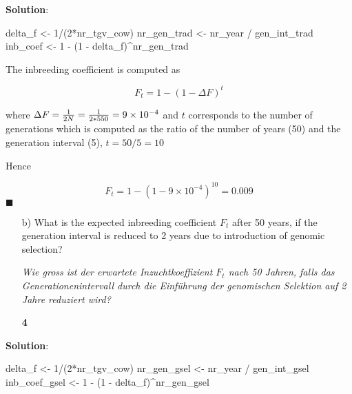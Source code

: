 \documentclass[
]{article}
\newenvironment{Shaded}{\begin{snugshade}}{\end{snugshade}}
\newcommand{\DecValTok}[1]{\textcolor[rgb]{0.00,0.00,0.81}{#1}}
\newcommand{\NormalTok}[1]{#1}
\newcommand{\OtherTok}[1]{\textcolor[rgb]{0.56,0.35,0.01}{#1}}
\newcommand{\SpecialCharTok}[1]{\textcolor[rgb]{0.00,0.00,0.00}{#1}}
\newcommand{\points}[1]
{\begin{flushright}\textbf{#1}\end{flushright}}
\newcommand{\solstart}
{\vspace{3ex}\textbf{Solution}:}
\newcommand{\solend}
{\vspace{2ex}$\blacksquare$}
\begin{document}
\vspace{3ex}
\solstart

\begin{Shaded}
\begin{Highlighting}[]
\NormalTok{delta\_f }\OtherTok{\textless{}{-}} \DecValTok{1}\SpecialCharTok{/}\NormalTok{(}\DecValTok{2}\SpecialCharTok{*}\NormalTok{nr\_tgv\_cow)}
\NormalTok{nr\_gen\_trad }\OtherTok{\textless{}{-}}\NormalTok{ nr\_year }\SpecialCharTok{/}\NormalTok{ gen\_int\_trad}
\NormalTok{inb\_coef }\OtherTok{\textless{}{-}} \DecValTok{1} \SpecialCharTok{{-}}\NormalTok{ (}\DecValTok{1} \SpecialCharTok{{-}}\NormalTok{ delta\_f)}\SpecialCharTok{\^{}}\NormalTok{nr\_gen\_trad}
\end{Highlighting}
\end{Shaded}

The inbreeding coefficient is computed as

\[F_t = 1 - (1 - \Delta F)^t\]

where
\(\Delta F = {1 \over 2N} = {1 \over 2*550} = \ensuremath{9\times 10^{-4}}\)
and \(t\) corresponds to the number of generations which is computed as
the ratio of the number of years (50) and the generation interval (5),
\(t= 50 / 5 = 10\)

Hence

\[F_t =  1 - (1 - \ensuremath{9\times 10^{-4}})^{10} = 0.009\] \solend

\clearpage
\pagebreak

\begin{enumerate}
\item[b)] What is the expected inbreeding coefficient $F_t$ after 50 years, if the generation interval is reduced to 2 years due to introduction of genomic selection?

\textit{Wie gross ist der erwartete Inzuchtkoeffizient $F_t$ nach 50 Jahren, falls das Generationenintervall durch die Einführung der genomischen Selektion auf 2 Jahre reduziert wird?}
\points{4}
\end{enumerate}

\vspace{3ex}
\solstart

\begin{Shaded}
\begin{Highlighting}[]
\NormalTok{delta\_f }\OtherTok{\textless{}{-}} \DecValTok{1}\SpecialCharTok{/}\NormalTok{(}\DecValTok{2}\SpecialCharTok{*}\NormalTok{nr\_tgv\_cow)}
\NormalTok{nr\_gen\_gsel }\OtherTok{\textless{}{-}}\NormalTok{ nr\_year }\SpecialCharTok{/}\NormalTok{ gen\_int\_gsel}
\NormalTok{inb\_coef\_gsel }\OtherTok{\textless{}{-}} \DecValTok{1} \SpecialCharTok{{-}}\NormalTok{ (}\DecValTok{1} \SpecialCharTok{{-}}\NormalTok{ delta\_f)}\SpecialCharTok{\^{}}\NormalTok{nr\_gen\_gsel}
\end{Highlighting}
\end{Shaded}
\end{document}
